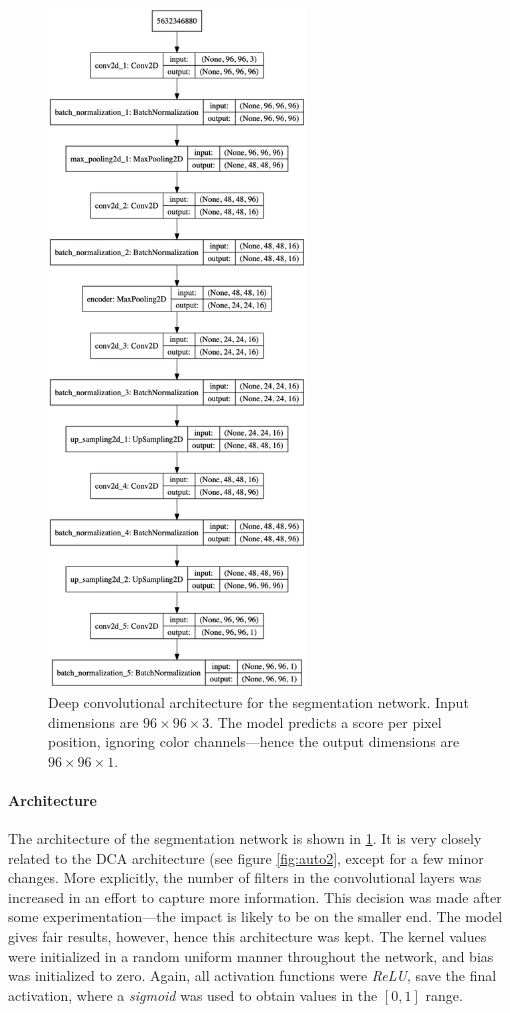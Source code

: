 \begin{figure}[!htbp]
  \begin{center}
    \includegraphics[height=18cm, keepaspectratio]{images/segm_architecture}
    \caption{Deep convolutional architecture for the segmentation network. Input dimensions are $96 \times 96 \times 3$. The model predicts a score per pixel position, ignoring color channels---hence the output dimensions are $96 \times 96 \times 1$.}
    \label{fig:segm_architecture}
  \end{center}
\end{figure}

\paragraph{Architecture} The architecture of the segmentation network is shown in \ref{fig:segm_architecture}. It is very closely related to the DCA architecture (see figure \textcolor{blue}{\ref{fig:auto2}}, except for a few minor changes. More explicitly, the number of filters in the convolutional layers was increased in an effort to capture more information. This decision was made after some experimentation---the impact is likely to be on the smaller end. The model gives fair results, however, hence this architecture was kept. The kernel values were initialized in a random uniform manner throughout the network, and bias was initialized to zero. Again, all activation functions were \textit{ReLU}, save the final activation, where a \textit{sigmoid} was used to obtain values in the $[0,1]$ range.

